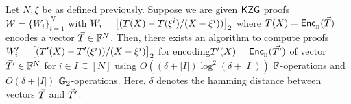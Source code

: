 \begin{lemma}\label{lem:approx-setup}
Let $N,\xi$ be as defined previously. Suppose we are given
$\mathsf{KZG}$ proofs $\mathcal{W}=\{W_i\}_{i=1}^N$ with $W_i=\left[{(T(X) - T(\xi^i)/(X-\xi^i))}\right]_2$ where
$T(X)=\mathsf{Enc}_{{}_{\mathbb{H}}}(\vec{T})$ encodes a vector $\vec{T}\in \mathbb{F}^N$. Then,
there exists an algorithm to compute proofs
$W_i'=\left[{(T'(X) - T'(\xi^i))/(X-\xi^i)}\right]_2$ for encoding$T'(X)=\mathsf{Enc}_{{}_{\mathbb{H}}}(\vec{T'})$ of vector $\vec{T}'\in \mathbb{F}^N$
for $i\in I\subseteq [N]$ using $O((\delta + |I|) \log^2 (\delta + |I|))$ $\mathbb{F}$-operations and $O(\delta + |I|)$ $\mathbb{G}_2$-operations.
Here, $\delta$ denotes the hamming distance
between vectors $\vec{T}$ and $\vec{T}'$.
\end{lemma}